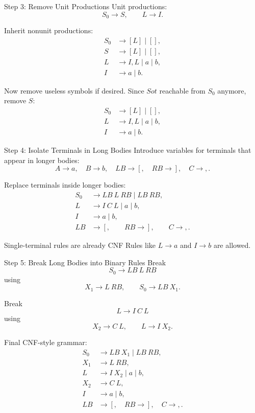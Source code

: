 \documentclass[aspectratio=169,10pt]{beamer}
\begin{document}
\begin{frame}{Step 3: Remove Unit Productions}
\small
Unit productions:
\[
S_0\to S,
\qquad
L\to I.
\]

Inherit nonunit productions:
\[
\begin{aligned}
S_0&\to [L]\mid [],\\
S&\to [L]\mid [],\\
L&\to I,L\mid a\mid b,\\
I&\to a\mid b.
\end{aligned}
\]

Now remove useless symbols if desired. Since \(S
ot\) reachable from \(S_0\) anymore, remove \(S\):
\[
\begin{aligned}
S_0&\to [L]\mid [],\\
L&\to I,L\mid a\mid b,\\
I&\to a\mid b.
\end{aligned}
\]
\end{frame}

\begin{frame}{Step 4: Isolate Terminals in Long Bodies}
\small
Introduce variables for terminals that appear in longer bodies:
\[
A\to a,
\quad
B\to b,
\quad
LB\to [,
\quad
RB\to ],
\quad
C\to ,.
\]

Replace terminals inside longer bodies:
\[
\begin{aligned}
S_0&\to LB\ L\ RB\mid LB\ RB,\\
L&\to I\ C\ L\mid a\mid b,\\
I&\to a\mid b,\\
LB&\to [,\qquad RB\to ],\qquad C\to ,.
\end{aligned}
\]

\begin{alertblock}{Single-terminal rules are already CNF}
Rules like \(L\to a\) and \(I\to b\) are allowed.
\end{alertblock}
\end{frame}

\begin{frame}{Step 5: Break Long Bodies into Binary Rules}
\small
Break
\[
S_0\to LB\ L\ RB
\]
using
\[
X_1\to L\ RB,
\qquad
S_0\to LB\ X_1.
\]

Break
\[
L\to I\ C\ L
\]
using
\[
X_2\to C\ L,
\qquad
L\to I\ X_2.
\]

Final CNF-style grammar:
\[
\begin{aligned}
S_0&\to LB\ X_1\mid LB\ RB,\\
X_1&\to L\ RB,\\
L&\to I\ X_2\mid a\mid b,\\
X_2&\to C\ L,\\
I&\to a\mid b,\\
LB&\to [,\quad RB\to ],\quad C\to ,.
\end{aligned}
\]
\end{frame}
\end{document}
